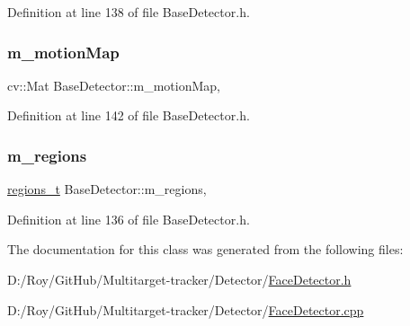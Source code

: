 Definition at line 138 of file Base\+Detector.\+h.

\mbox{\label{class_base_detector_a45a2d54a0b69e271aa5c44ee301682b7}} 
\subsubsection{\texorpdfstring{m\+\_\+motion\+Map}{m\_motionMap}}
{\footnotesize\ttfamily cv\+::\+Mat Base\+Detector\+::m\+\_\+motion\+Map\hspace{0.3cm}{\ttfamily [protected]}, {\ttfamily [inherited]}}



Definition at line 142 of file Base\+Detector.\+h.

\mbox{\label{class_base_detector_a409c20093acba261db8354ca72058fce}} 
\subsubsection{\texorpdfstring{m\+\_\+regions}{m\_regions}}
{\footnotesize\ttfamily \mbox{\hyperlink{defines_8h_a01db0de56a20f4342820a093c5154536}{regions\+\_\+t}} Base\+Detector\+::m\+\_\+regions\hspace{0.3cm}{\ttfamily [protected]}, {\ttfamily [inherited]}}



Definition at line 136 of file Base\+Detector.\+h.



The documentation for this class was generated from the following files\+:\begin{DoxyCompactItemize}
\item 
D\+:/\+Roy/\+Git\+Hub/\+Multitarget-\/tracker/\+Detector/\mbox{\hyperlink{_face_detector_8h}{Face\+Detector.\+h}}\item 
D\+:/\+Roy/\+Git\+Hub/\+Multitarget-\/tracker/\+Detector/\mbox{\hyperlink{_face_detector_8cpp}{Face\+Detector.\+cpp}}\end{DoxyCompactItemize}
